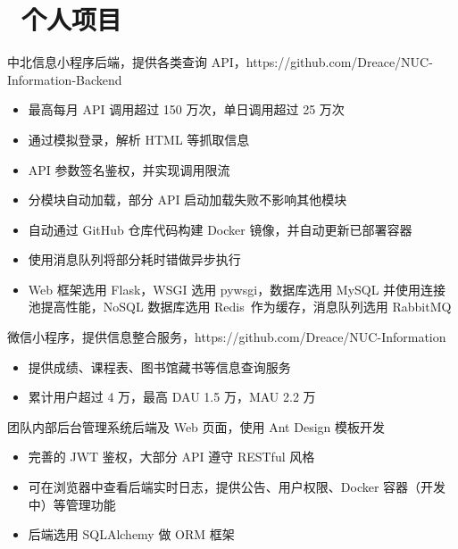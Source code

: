 \documentclass{resume}
\begin{document}
\section{\faUsers\ 个人项目}
\begin{onehalfspacing}
  中北信息小程序后端，提供各类查询 API，https://github.com/Dreace/NUC-Information-Backend
  \begin{itemize}
    \item 最高每月 API 调用超过 150 万次，单日调用超过 25 万次
    \item 通过模拟登录，解析 HTML 等抓取信息
    \item API 参数签名鉴权，并实现调用限流
    \item 分模块自动加载，部分 API 启动加载失败不影响其他模块
    \item 自动通过 GitHub 仓库代码构建 Docker 镜像，并自动更新已部署容器
    \item 使用消息队列将部分耗时错做异步执行
    \item Web 框架选用 Flask，WSGI 选用 pywsgi，数据库选用 MySQL 并使用连接池提高性能，NoSQL 数据库选用 Redis\
          作为缓存，消息队列选用 RabbitMQ
  \end{itemize}
\end{onehalfspacing}

\begin{onehalfspacing}
  微信小程序，提供信息整合服务，https://github.com/Dreace/NUC-Information
  \begin{itemize}
    \item 提供成绩、课程表、图书馆藏书等信息查询服务
    \item 累计用户超过 4 万，最高 DAU 1.5 万，MAU 2.2 万
  \end{itemize}
\end{onehalfspacing}

\begin{onehalfspacing}
  团队内部后台管理系统后端及 Web 页面，使用 Ant Design 模板开发
  \begin{itemize}
    \item 完善的 JWT 鉴权，大部分 API 遵守 RESTful 风格
    \item 可在浏览器中查看后端实时日志，提供公告、用户权限、Docker 容器（开发中）等管理功能
    \item 后端选用 SQLAlchemy 做 ORM 框架
  \end{itemize}
\end{onehalfspacing}
\end{document}

